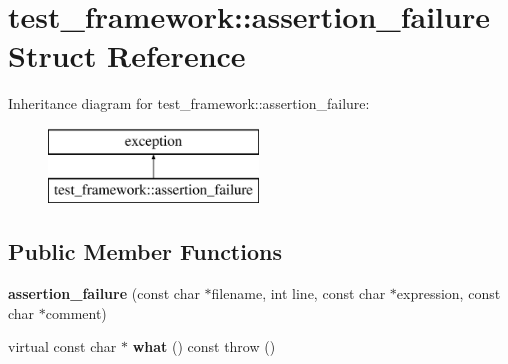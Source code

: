\hypertarget{structtest__framework_1_1assertion__failure}{}\section{test\+\_\+framework\+:\+:assertion\+\_\+failure Struct Reference}
\label{structtest__framework_1_1assertion__failure}
Inheritance diagram for test\+\_\+framework\+:\+:assertion\+\_\+failure\+:\begin{figure}[H]
\begin{center}
\leavevmode
\includegraphics[height=2.000000cm]{structtest__framework_1_1assertion__failure}
\end{center}
\end{figure}
\subsection*{Public Member Functions}
\begin{DoxyCompactItemize}
\item 
\hypertarget{structtest__framework_1_1assertion__failure_a1433d39da1c46ba0fa51ee2a2314e686}{}{\bfseries assertion\+\_\+failure} (const char $\ast$filename, int line, const char $\ast$expression, const char $\ast$comment)\label{structtest__framework_1_1assertion__failure_a1433d39da1c46ba0fa51ee2a2314e686}

\item 
\hypertarget{structtest__framework_1_1assertion__failure_aaf4831a9415acd29ec1015c0379982f6}{}virtual const char $\ast$ {\bfseries what} () const   throw ()\label{structtest__framework_1_1assertion__failure_aaf4831a9415acd29ec1015c0379982f6}

\end{DoxyCompactItemize}

